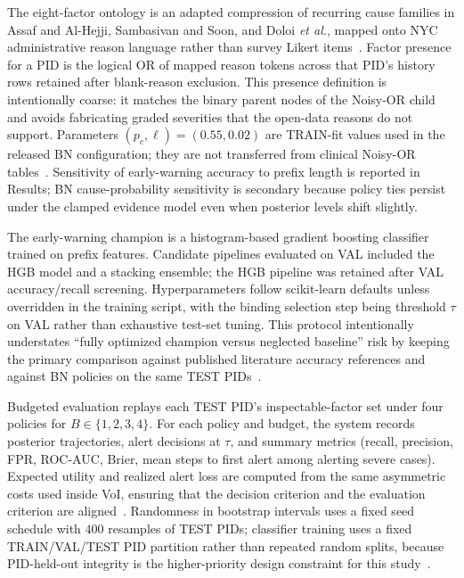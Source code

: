 The eight-factor ontology is an adapted compression of recurring cause families in Assaf and Al-Hejji, Sambasivan and Soon, and Doloi \textit{et al.}, mapped onto NYC administrative reason language rather than survey Likert items~\cite{Assaf2006,Sambasivan2007,Doloi2012}. Factor presence for a PID is the logical OR of mapped reason tokens across that PID's history rows retained after blank-reason exclusion. This presence definition is intentionally coarse: it matches the binary parent nodes of the Noisy-OR child and avoids fabricating graded severities that the open-data reasons do not support. Parameters $(p_c,\ell)=(0.55,0.02)$ are TRAIN-fit values used in the released BN configuration; they are not transferred from clinical Noisy-OR tables~\cite{Onisko2001}. Sensitivity of early-warning accuracy to prefix length is reported in Results; BN cause-probability sensitivity is secondary because policy ties persist under the clamped evidence model even when posterior levels shift slightly.

The early-warning champion is a histogram-based gradient boosting classifier trained on prefix features. Candidate pipelines evaluated on VAL included the HGB model and a stacking ensemble; the HGB pipeline was retained after VAL accuracy/recall screening. Hyperparameters follow scikit-learn defaults unless overridden in the training script, with the binding selection step being threshold $\tau$ on VAL rather than exhaustive test-set tuning. This protocol intentionally understates ``fully optimized champion versus neglected baseline'' risk by keeping the primary comparison against published literature accuracy references and against BN policies on the same TEST PIDs~\cite{Egwim2021,Friedman2001}.

Budgeted evaluation replays each TEST PID's inspectable-factor set under four policies for $B\in\{1,2,3,4\}$. For each policy and budget, the system records posterior trajectories, alert decisions at $\tau$, and summary metrics (recall, precision, FPR, ROC-AUC, Brier, mean steps to first alert among alerting severe cases). Expected utility and realized alert loss are computed from the same asymmetric costs used inside VoI, ensuring that the decision criterion and the evaluation criterion are aligned~\cite{Howard1966,Vickers2006}. Randomness in bootstrap intervals uses a fixed seed schedule with $400$ resamples of TEST PIDs; classifier training uses a fixed TRAIN/VAL/TEST PID partition rather than repeated random splits, because PID-held-out integrity is the higher-priority design constraint for this study~\cite{Tagharobi2025}.

